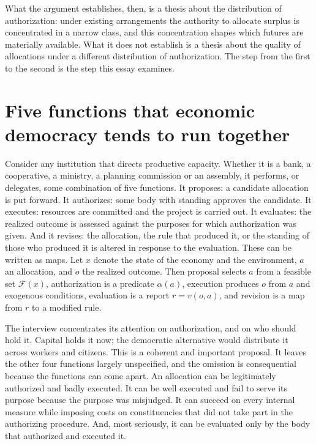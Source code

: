 \documentclass[12pt]{article}
\theoremstyle{definition}
\begin{document}
What the argument establishes, then, is a thesis about the distribution of authorization: under existing arrangements the authority to allocate surplus is concentrated in a narrow class, and this concentration shapes which futures are materially available. What it does not establish is a thesis about the quality of allocations under a different distribution of authorization. The step from the first to the second is the step this essay examines.

\section{Five functions that economic democracy tends to run together}\label{sec:functions}

Consider any institution that directs productive capacity. Whether it is a bank, a cooperative, a ministry, a planning commission or an assembly, it performs, or delegates, some combination of five functions. It proposes: a candidate allocation is put forward. It authorizes: some body with standing approves the candidate. It executes: resources are committed and the project is carried out. It evaluates: the realized outcome is assessed against the purposes for which authorization was given. And it revises: the allocation, the rule that produced it, or the standing of those who produced it is altered in response to the evaluation. These can be written as maps. Let $x$ denote the state of the economy and the environment, $a$ an allocation, and $o$ the realized outcome. Then proposal selects $a$ from a feasible set $\mathcal{F}(x)$, authorization is a predicate $\alpha(a)$, execution produces $o$ from $a$ and exogenous conditions, evaluation is a report $r=v(o,a)$, and revision is a map from $r$ to a modified rule.

The interview concentrates its attention on authorization, and on who should hold it. Capital holds it now; the democratic alternative would distribute it across workers and citizens. This is a coherent and important proposal. It leaves the other four functions largely unspecified, and the omission is consequential because the functions can come apart. An allocation can be legitimately authorized and badly executed. It can be well executed and fail to serve its purpose because the purpose was misjudged. It can succeed on every internal measure while imposing costs on constituencies that did not take part in the authorizing procedure. And, most seriously, it can be evaluated only by the body that authorized and executed it.
\end{document}
